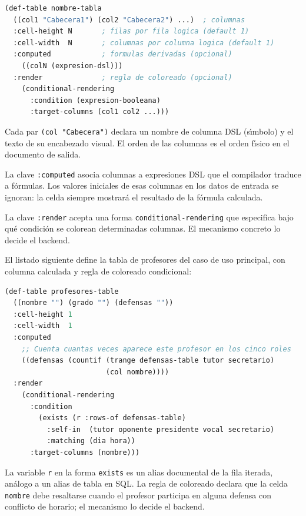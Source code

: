 \begin{lstlisting}[language=CommonLisp,
  caption={Sintaxis completa de def-table.}]
(def-table nombre-tabla
  ((col1 "Cabecera1") (col2 "Cabecera2") ...)  ; columnas
  :cell-height N       ; filas por fila logica (default 1)
  :cell-width  N       ; columnas por columna logica (default 1)
  :computed            ; formulas derivadas (opcional)
    ((colN (expresion-dsl)))
  :render              ; regla de coloreado (opcional)
    (conditional-rendering
      :condition (expresion-booleana)
      :target-columns (col1 col2 ...)))
\end{lstlisting}

Cada par \texttt{(col "Cabecera")} declara un nombre de columna DSL
(s\'{\i}mbolo) y el texto de su encabezado visual.  El orden de las columnas
es el orden f\'{\i}sico en el documento de salida.

La clave \texttt{:computed} asocia columnas a expresiones DSL que el
compilador traduce a f\'ormulas.  Los valores iniciales de esas columnas
en los datos de entrada se ignoran: la celda siempre mostrar\'a el resultado
de la f\'ormula calculada.

La clave \texttt{:render} acepta una forma \texttt{conditional-rendering}
que especifica bajo qu\'e condici\'on se colorean determinadas columnas.
El mecanismo concreto lo decide el backend.

El listado siguiente define la tabla de profesores del caso de uso
principal, con columna calculada y regla de coloreado condicional:

\begin{lstlisting}[language=CommonLisp,
  caption={Tabla de profesores con columna computed y regla de coloreado.}]
(def-table profesores-table
  ((nombre "") (grado "") (defensas ""))
  :cell-height 1
  :cell-width  1
  :computed
    ;; Cuenta cuantas veces aparece este profesor en los cinco roles
    ((defensas (countif (trange defensas-table tutor secretario)
                        (col nombre))))
  :render
    (conditional-rendering
      :condition
        (exists (r :rows-of defensas-table)
          :self-in  (tutor oponente presidente vocal secretario)
          :matching (dia hora))
      :target-columns (nombre)))
\end{lstlisting}

La variable \texttt{r} en la forma \texttt{exists} es un alias documental
de la fila iterada, an\'alogo a un alias de tabla en SQL.  La regla de
coloreado declara que la celda \texttt{nombre} debe resaltarse cuando el
profesor participa en alguna defensa con conflicto de horario; el mecanismo
lo decide el backend.

